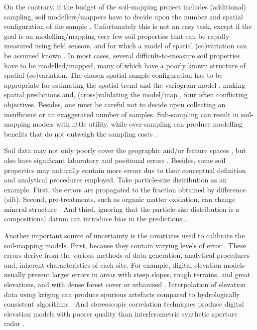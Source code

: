 On the contrary, if the budget of the soil-mapping project includes (additional) sampling, soil 
modellers/mappers have to decide upon the number and spatial configuration of the sample 
\citep{deGruijterEtAl2006, WebsterEtAl2013}. Unfortunately this is not an easy task, except if the 
goal is on modelling/mapping very few soil properties that can be rapidly measured using field 
sensors, and for which a model of spatial (co)variation can be assumed known \citep{MarchantEtAl2006}.
In most cases, several difficult-to-measure soil properties have to be modelled/mapped, many of 
which have a poorly known structure of spatial (co)variation. The chosen spatial sample configuration
has to be appropriate for estimating the spatial trend \citep{HenglEtAl2003a, MinasnyEtAl2006b} and 
the variogram model \citep{WarrickEtAl1987, WebsterEtAl1992, Lark2002}, making spatial predictions 
\citep{YfantisEtAl1987, WalvoortEtAl2010} and, (cross)validating the model/map \citep{BrusEtAl2011}, 
four often conflicting objectives. Besides, one must be careful not to decide upon collecting an 
insufficient or an exaggerated number of samples. Sub-sampling can result in soil-mapping models 
with little utility, while over-sampling can produce modelling benefits that do not outweigh the
sampling costs \citep{vanGroenigenEtAl1999}.

Soil data may not only poorly cover the geographic and/or feature spaces \citep{HenglEtAl2003a}, but
also have significant laboratory and positional errors \citep{NelsonEtAl2011}. Besides, some soil 
properties may naturally contain more errors due to their conceptual definition and analytical 
procedures employed. Take particle-size distribution as an example. First, the errors are propagated
to the fraction obtained by difference (silt). Second, pre-treatments, such as organic matter 
oxidation, can change mineral structure \citep{MikuttaEtAl2005a}. And third, ignoring that the 
particle-size distribution is a compositional datum can introduce bias in the predictions 
\citep{LarkEtAl2007}.

Another important source of uncertainty is the covariates used to calibrate the soil-mapping models.
First, because they contain varying levels of error \citep{HeuvelinkEtAl1989}. These errors derive 
from the various methods of data generation, analytical procedures and, inherent characteristics of 
each site. For example, digital elevation models usually present larger errors in areas with steep 
slopes, rough terrains, and great elevations, and with dense forest cover or urbanized 
\citep{Florinsky1998, Toutin2000, FisherEtAl2006}. Interpolation of elevation data using kriging 
can produce spurious artefacts \citep{HenglEtAl2009} compared to hydrologically consistent 
algorithms \citep{Hutchinson1989}. And stereoscopic correlation techniques produce digital elevation
models with poorer quality than interferometric synthetic aperture radar \citep{HirtEtAl2010}.

